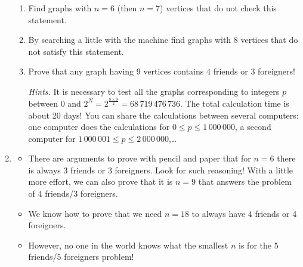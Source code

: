 \documentclass[11pt,class=report,crop=false]{standalone}
\begin{document}
\begin{activite}[To go further]
\begin{enumerate}
  \begin{enumerate}
    \item Find graphs with $n=6$ (then $n=7$) vertices that do not check this statement.
    \item By searching a little with the machine find graphs with $8$ vertices that do not satisfy this statement.
    \item Prove that any graph having $9$ vertices contains $4$ friends or $3$ foreigners! 
     
  \emph{Hints.} It is necessary to test all the graphs corresponding to integers $p$ between $0$ and $2^N = 2^{\frac{8 \times 9}{2}} = 68\,719\,476\,736$. The total calculation time is about 20 days! You can share the calculations between several computers: one computer does the calculations for $0 \le p \le 1\,000\,000$, a second computer for $1\,000\,001 \le p \le 2\,000\,000$,\ldots
    
  \end{enumerate}
  
  \item 
  \begin{itemize}
    \item There are arguments to prove with pencil and paper that for $n=6$ there is always $3$ friends or $3$ foreigners. Look for such reasoning! With a little more effort, we can also prove that it is $n=9$ that answers the problem of $4$ friends/$3$ foreigners.
    
    \item We know how to prove that we need $n=18$ to always have $4$ friends or $4$ foreigners.
    
    \item However, no one in the world knows what the smallest $n$ is for the $5$ friends/$5$ foreigners problem!
  \end{itemize}

\end{enumerate}

\end{activite}
\end{document}
